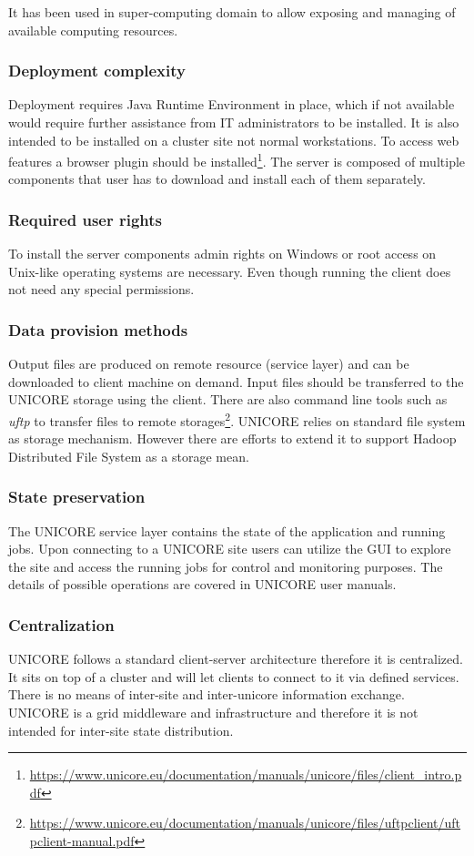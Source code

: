 It has been used in super-computing domain to allow exposing and managing of available 
computing resources.\cite{unicore_arch}

\subsubsection {Deployment complexity}
Deployment requires Java Runtime Environment in place, which if not available would require 
further assistance from IT administrators to be installed. It is also intended to be installed
on a cluster site not normal workstations. To access web features a browser plugin should be
installed\footnote{
\url{https://www.unicore.eu/documentation/manuals/unicore/files/client_intro.pdf}}.
The server is composed of multiple components that user 
has to download and install each of them separately.
\subsubsection {Required user rights}
To install the server components admin rights on Windows or root access on Unix-like operating
systems are necessary. Even though running the client does not need any special permissions.
\subsubsection{Data provision methods}
Output files are produced on remote resource (service layer) and can be downloaded to client
machine on demand. Input files should be transferred to the UNICORE storage using the client.
There are also command line tools such as \textit{uftp} to transfer files to remote 
storages\footnote{
\url{https://www.unicore.eu/documentation/manuals/unicore/files/uftpclient/uftpclient-manual.pdf}}.
UNICORE relies on standard file system as storage mechanism. However there are efforts to 
extend it to support Hadoop Distributed File System as a storage mean.\cite{wasim2009}
\subsubsection {State preservation}
The UNICORE service layer contains the state of the application and running jobs. 
Upon connecting to a UNICORE site users can utilize the GUI to explore 
the site and access the running jobs for control and monitoring purposes.
The details of possible operations are covered in UNICORE user manuals.

\subsubsection {Centralization}
UNICORE follows a standard client-server architecture therefore it is centralized. It sits on 
top of a cluster and will let clients to connect to it via defined services. There is no means
of inter-site and inter-unicore information exchange. UNICORE is a grid middleware and
infrastructure and therefore it is not intended for inter-site state distribution.
